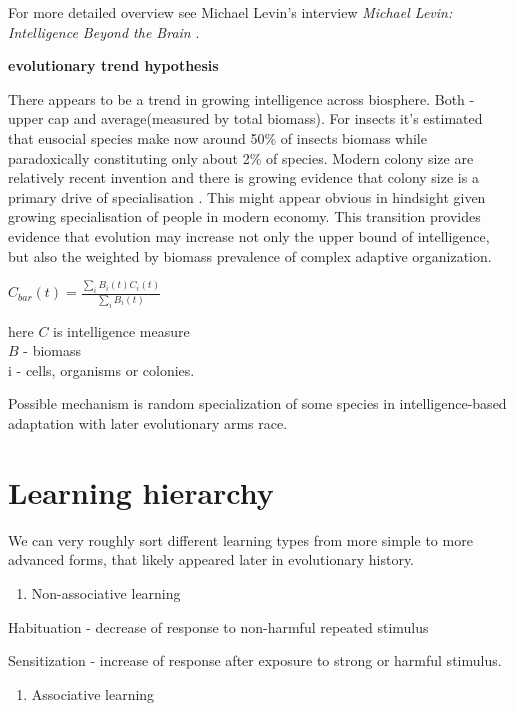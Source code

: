 For more detailed overview see Michael Levin's interview \emph{Michael Levin: Intelligence Beyond the Brain} \cite{levin_intelligence_beyond_brain}.
\newline

\textbf{evolutionary trend hypothesis}

There appears to be a trend in growing intelligence across biosphere. Both - upper cap and average(measured by total biomass). For insects it's estimated that eusocial species make now around 50\% \cite{wilson1971insect} of insects biomass while paradoxically constituting only about 2\% of species. Modern colony size are relatively recent invention \cite{vida2025postkpg} and there is growing evidence that colony size is a primary drive of specialisation \cite{bellroberts2024evolution}. This might appear obvious in hindsight given growing specialisation of people in modern economy. This transition provides evidence that evolution may increase not only the upper bound of intelligence, but also the weighted by biomass prevalence of complex adaptive organization.

$C_{bar}(t) = \frac{\sum_i B_i(t) C_i(t)}  {\sum_i B_i(t)}$

here $C$ is intelligence measure\\
$B$ - biomass  \\
i - cells, organisms or colonies.

Possible mechanism is random specialization of some species in intelligence-based adaptation with later evolutionary arms race.


\section{Learning hierarchy}\label{learning-hierarchy}
We can very roughly sort different learning types from more simple to more advanced forms, that likely appeared later in evolutionary history.

\begin{enumerate}
\def\labelenumi{\arabic{enumi}.}
\item
  Non-associative learning
\end{enumerate}

Habituation - decrease of response to non-harmful repeated stimulus

Sensitization - increase of response after exposure to strong or harmful stimulus.

\begin{enumerate}
\def\labelenumi{\arabic{enumi}.}
\setcounter{enumi}{1}
\item
  Associative learning
\end{enumerate}

